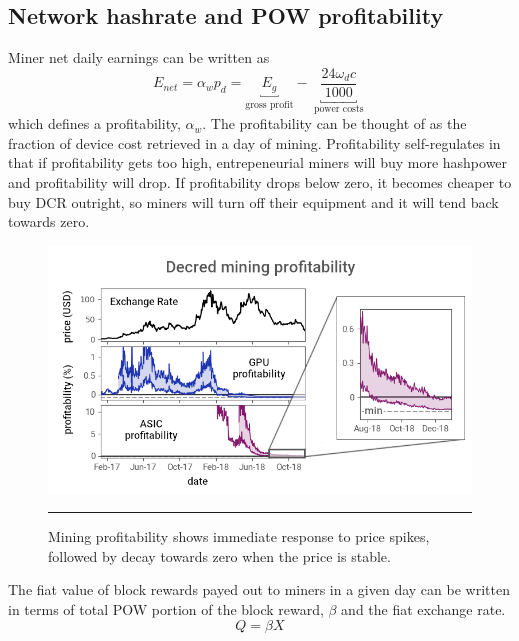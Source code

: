 \documentclass[a4paper,12pt]{article}
\begin{document}
\begin{appendices}
\section{Network hashrate and POW profitability}

Miner net daily earnings can be written as 
%
\begin{equation}
E_{net} = \alpha_w p_d = \underbracket{ E_g }_{\text{gross profit}} -  \underbracket{ \frac{ 24 \omega_d c }{ 1000 } }_{ \text{ power costs } } 
\end{equation}
%
which defines a profitability, $ \alpha_w $. The profitability can be thought of as the fraction of device cost retrieved in a day of mining. Profitability self-regulates in that if profitability gets too high, entrepeneurial miners will buy more hashpower and profitability will drop. If profitability drops below zero, it becomes cheaper to buy DCR outright, so miners will turn off their equipment and it will tend back towards zero. 

\begin{figure}
	\centering
	\includegraphics[scale=1.60]{profitability}
	\caption{Mining profitability shows immediate response to price spikes, followed by decay towards zero when the price is stable. }
	\vspace{5pt}
	\hrule
	\vspace{6pt}
\end{figure}

The fiat value of block rewards payed out to miners in a given day can be written in terms of total POW portion of the block reward, $ \beta $ and the fiat exchange rate.
%
\begin{equation}
Q = \beta X
\end{equation}
%


\end{appendices}
\end{document}
